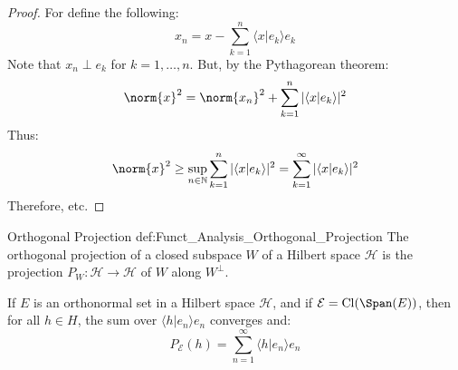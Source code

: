         \begin{proof}
            For define the following:
            \begin{equation}
                x_{n}=x-\sum_{k=1}^{n}
                    \langle{x|e_{k}}\rangle{e}_{k}
            \end{equation}
            Note that $x_{n}\perp{e}_{k}$ for $k=1,\dots,n$.
            But, by the Pythagorean theorem:
            \begin{equation}
                \norm{x}^{2}=\norm{x_{n}}^{2}+
                    \sum_{k=1}^{n}|\langle{x|e_{k}}\rangle|^{2}
            \end{equation}
            Thus:
            \begin{equation}
                \norm{x}^{2}\geq\underset{n\in\mathbb{N}}{\sup}
                    \sum_{k=1}^{n}|\langle{x|e_{k}}\rangle|^{2}
                    =\sum_{k=1}^{\infty}|\langle{x|e_{k}}\rangle|^{2}
            \end{equation}
            Therefore, etc.
        \end{proof}
        \begin{ldefinition}{Orthogonal Projection}
              {def:Funct_Analysis_Orthogonal_Projection}
            The orthogonal projection of a closed subspace $W$
            of a Hilbert space $\mathcal{H}$ is the projection
            $P_{W}:\mathcal{H}\rightarrow\mathcal{H}$ of
            $W$ along $W^{\perp}$.
        \end{ldefinition}
        \begin{theorem}
            If $E$ is an orthonormal set in a Hilbert space
            $\mathcal{H}$, and if
            $\mathcal{E}=\mathrm{Cl}(\Span(E))$, then for all
            $h\in{H}$, the sum over
            $\langle{h|e_{n}}\rangle{e}_{n}$ converges and:
            \begin{equation}
                P_{\mathcal{E}}(h)=\sum_{n=1}^{\infty}
                    \langle{h|e_{n}}\rangle{e}_{n}
            \end{equation}
        \end{theorem}
